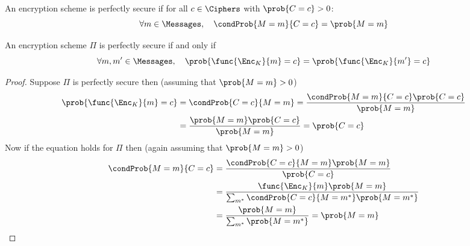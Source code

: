 \begin{definition}
    An encryption scheme is perfectly secure if for all \(c \in \Ciphers\) with \(\prob{C = c} > 0\):
    \begin{equation}
        \forall m \in \Messages, \quad \condProb{M = m}{C = c} = \prob{M = m}
    \end{equation}
 \end{definition} 

 \begin{proposition}
     An encryption scheme \(\Pi\) is perfectly secure if and only if 
     \begin{equation}
         \forall m,m' \in \Messages, \quad \prob{\func{\Enc_K}{m} = c} = \prob{\func{\Enc_K}{m'} = c}
     \end{equation}
 \end{proposition}

 \begin{proof}
     Suppose \(\Pi\) is perfectly secure then (assuming that \(\prob{M = m} > 0\))
     \begin{align*}
         \prob{\func{\Enc_K}{m} = c} &=  \condProb{C = c}{M = m} = \dfrac{\condProb{M = m}{C = c} \prob{C = c}}{\prob{M = m}}\\
         &= \dfrac{\prob{M = m} \prob{C= c}}{\prob{M= m}} = \prob{C = c}
     \end{align*}
     Now if the equation holds for \(\Pi\) then (again assuming that \(\prob{M = m} > 0 \))
     \begin{align*}
        \condProb{M = m}{C = c} &= \dfrac{\condProb{C = c}{M = m} \prob{M = m}}{\prob{C = c}}\\
        &= \dfrac{\func{\Enc_K}{m} \prob{M = m}}{\sum_{m^{\ast}} \condProb{C = c}{M = m^{\ast}} \prob{M = m^{\ast}}}\\
        &= \dfrac{\prob{M = m}}{\sum_{m^{\ast}} \prob{M = m^{\ast}}} = \prob{M = m}
     \end{align*}
 \end{proof}
